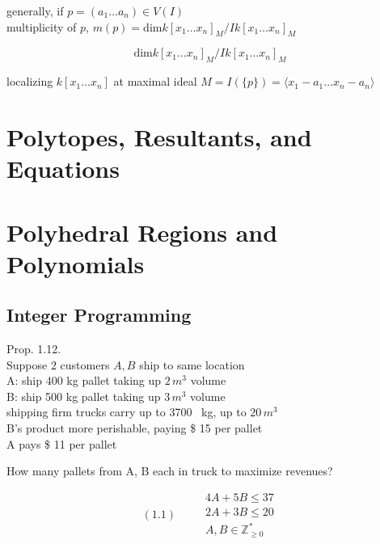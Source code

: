 \documentclass[10pt]{amsart}
\begin{document}
\begin{multicols*}{2}
generally, if $p=(a_1 \dots a_n) \in V(I)$ \\
multiplicity of $p$, $m(p) = \text{dim}{ k[x_1 \dots x_n]_M } / Ik[x_1 \dots x_n]_M$

\[
\text{dim}{ k[x_1 \dots x_n]_M } / Ik[x_1 \dots x_n]_M
\]

localizing $k[x_1 \dots x_n]$ at maximal ideal $M = I(\lbrace p \rbrace) = \langle x_1 - a_1 \dots x_n-a_n \rangle$


\section{}

\section{}

\section{ Polytopes, Resultants, and Equations }

\section{ Polyhedral Regions and Polynomials }

\subsection{ Integer Programming }

Prop. 1.12. \\

Suppose 2 customers $A, B$ ship to same location \\
\quad A: ship 400 kg pallet taking up $2 \, m^3$ volume \\
\quad B: ship 500 kg pallet taking up $3 \, m^3$ volume \\

shipping firm trucks carry up to 3700 \, kg, up to $20 \, m^3$ \\

B's product more perishable, paying \$ 15 per pallet \\

A pays \$ 11 per pallet

How many pallets from A, B each in truck to maximize revenues?

\begin{equation}
(1.1) \quad \quad \, \begin{gathered}
    4A + 5B \leq 37 \\
    2A  + 3B \leq 20 \\
    A, B \in \mathbb{Z}^*_{ \geq 0 } \end{gathered}
\end{equation}


\end{multicols*}
\end{document}
